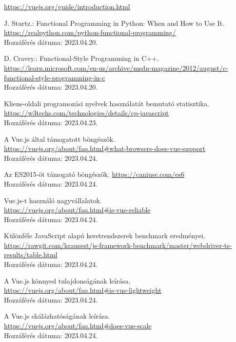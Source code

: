 \documentclass[12pt]{article}
\begin{document}
\begin{thebibliography}{99}
\url{https://vuejs.org/guide/introduction.html}

J. Sturtz.: Functional Programming in Python: When and How to Use It. \\
\url{https://realpython.com/python-functional-programming/}\\Hozzáférés dátuma: 2023.04.20.

D. Cravey.: Functional-Style Programming in C++. \\
\url{https://learn.microsoft.com/en-us/archive/msdn-magazine/2012/august/c-functional-style-programming-in-c}
\\Hozzáférés dátuma: 2023.04.20.

Kliens-oldali programozási nyelvek használatát bemutató statisztika. \\ \url{https://w3techs.com/technologies/details/cp-javascript}  \\Hozzáférés dátuma: 2023.04.23.

A Vue.js által támogatott böngészők. \\ \url{https://vuejs.org/about/faq.html#what-browsers-does-vue-support}\\ Hozzáférés dátuma: 2023.04.24.

Az ES2015-öt támogató böngészők. \url{https://caniuse.com/es6} \\Hozzáférés dátuma: 2023.04.24.

Vue.js-t használó nagyvállalatok. \\ \url{https://vuejs.org/about/faq.html#is-vue-reliable} \\Hozzáférés dátuma: 2023.04.24.

Különféle JavaScript alapú keretrendszerek benchmark eredményei. \\ \url{https://rawgit.com/krausest/js-framework-benchmark/master/webdriver-ts-results/table.html}\\ Hozzáférés dátuma: 2023.04.24.

A Vue.js könnyed tulajdonságának leírása. \\ \url{https://vuejs.org/about/faq.html#is-vue-lightweight} \\Hozzáférés dátuma: 2023.04.24.

A Vue.js skálázhatóságának leírása. \\ \url{https://vuejs.org/about/faq.html#does-vue-scale}\\ Hozzáférés dátuma: 2023.04.24.


\end{thebibliography}
\end{document}
